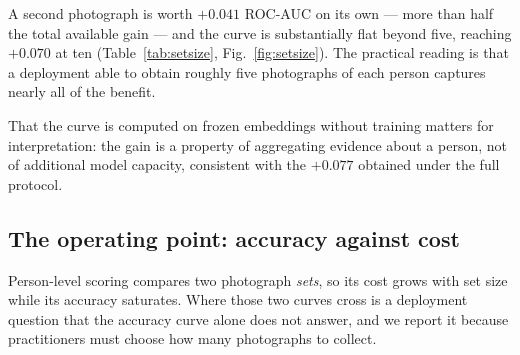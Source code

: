 \documentclass[journal,12pt]{IEEEtran}
\begin{document}
A second photograph is worth $+0.041$ ROC-AUC on its own --- more than half the
total available gain --- and the curve is substantially flat beyond five,
reaching $+0.070$ at ten (Table~\ref{tab:setsize}, Fig.~\ref{fig:setsize}).
The practical reading is that a deployment able to obtain roughly five
photographs of each person captures nearly all of the benefit.

That the curve is computed on frozen embeddings without training matters for
interpretation: the gain is a property of aggregating evidence about a person,
not of additional model capacity, consistent with the $+0.077$ obtained under
the full protocol.

\subsection{The operating point: accuracy against cost}
\label{sec:opcost}

Person-level scoring compares two photograph \emph{sets}, so its cost grows
with set size while its accuracy saturates. Where those two curves cross is a
deployment question that the accuracy curve alone does not answer, and we
report it because practitioners must choose how many photographs to collect.

\begin{table}[t]
\centering
\caption{Accuracy and cost against photographs per person. ROC-AUC is measured
on FIW; timings are per pair on one CPU core at $512$ dimensions. Accuracy is
flat beyond five photographs while cost continues to grow, which makes five a
natural operating point.}
\label{tab:opcost}
\small
{}
\end{table}
\end{document}
